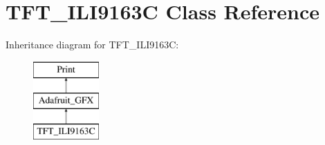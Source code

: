 \hypertarget{class_t_f_t___i_l_i9163_c}{}\section{T\+F\+T\+\_\+\+I\+L\+I9163\+C Class Reference}
\label{class_t_f_t___i_l_i9163_c}
Inheritance diagram for T\+F\+T\+\_\+\+I\+L\+I9163\+C\+:\begin{figure}[H]
\begin{center}
\leavevmode
\includegraphics[height=3.000000cm]{class_t_f_t___i_l_i9163_c}
\end{center}
\end{figure}
